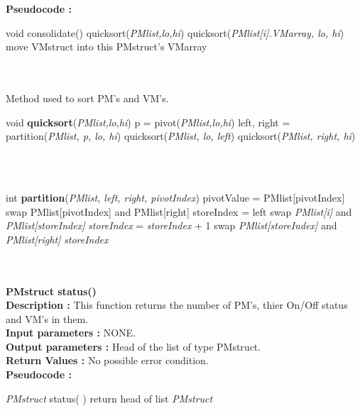 \documentclass[a4paper,11pt]{article}
\begin{document}
\textbf{Pseudocode :}
\begin{algorithmic}[1]
\STATE void consolidate()
\STATE quicksort(\emph{PMlist,lo,hi}) 
\STATE quicksort(\emph{PMlist[i].VMarray, lo, hi}) 
\STATE move VMstruct into this PMstruct's VMarray
\ENDIF
\ENDFOR
\ENDFOR
\ENDFOR
\end{algorithmic}
\mbox{}\\\\
Method used to sort PM's and VM's.
\begin{algorithmic}[1]
\STATE void \textbf{quicksort}(\emph{PMlist,lo,hi})
\STATE p = pivot(\emph{PMlist,lo,hi})
\STATE left, right = partition(\emph{PMlist, p, lo, hi})
\STATE quicksort(\emph{PMlist, lo, left})
\STATE quicksort(\emph{PMlist, right, hi})
\ENDIF
\end{algorithmic}
\mbox{}\\\\
\begin{algorithmic}[1]
\STATE int \textbf{partition}(\emph{PMlist, left, right, pivotIndex})
\STATE pivotValue = PMlist[pivotIndex]
\STATE swap PMlist[pivotIndex] and PMlist[right]
\STATE storeIndex = left
\STATE swap \emph{PMlist[i]} and \emph{PMlist[storeIndex]}
\STATE \emph{storeIndex} = \emph{storeIndex} + 1
\ENDIF
\STATE swap \emph{PMlist[storeIndex]} and \emph{PMlist[right]}
\ENDFOR
\RETURN \emph{storeIndex}
\end{algorithmic}
\mbox{}\\\\
\textbf{PMstruct status()}
\\
\textbf{Description :} This function returns the number of PM's, thier On/Off status and VM's in them.
\\
\textbf{Input parameters :} NONE.
\\
\textbf{Output parameters :} Head of the list of type PMstruct.
\\
\textbf{Return Values :} No possible error condition.
\\
\textbf{Pseudocode :}
\begin{algorithmic}[1]
\STATE \emph{PMstruct} status( )
\STATE return head of list \emph{PMstruct}
\end{algorithmic}
\end{document}
